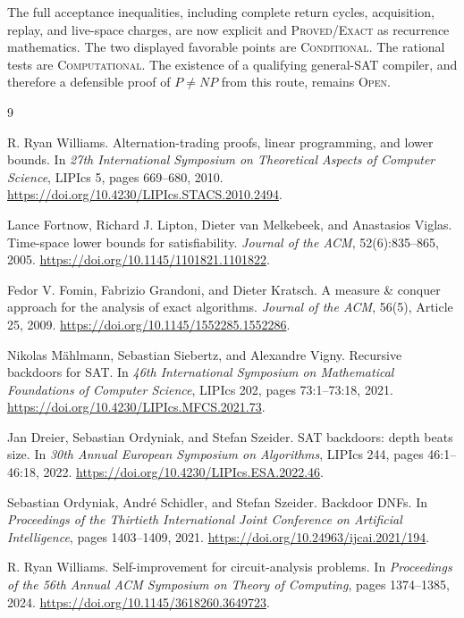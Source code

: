 \documentclass[11pt]{article}
\begin{document}
The full acceptance inequalities, including complete return cycles,
acquisition, replay, and live-space charges, are now explicit and
\textsc{Proved/Exact} as recurrence mathematics.  The two displayed favorable
points are \textsc{Conditional}.  The rational tests are
\textsc{Computational}.  The existence of a qualifying general-SAT compiler,
and therefore a defensible proof of \(P\ne NP\) from this route, remains
\textsc{Open}.

\begin{thebibliography}{9}

R. Ryan Williams.
\newblock Alternation-trading proofs, linear programming, and lower bounds.
\newblock In \emph{27th International Symposium on Theoretical Aspects of
Computer Science}, LIPIcs 5, pages 669--680, 2010.
\newblock \url{https://doi.org/10.4230/LIPIcs.STACS.2010.2494}.

Lance Fortnow, Richard J. Lipton, Dieter van Melkebeek, and Anastasios Viglas.
\newblock Time-space lower bounds for satisfiability.
\newblock \emph{Journal of the ACM}, 52(6):835--865, 2005.
\newblock \url{https://doi.org/10.1145/1101821.1101822}.

Fedor V. Fomin, Fabrizio Grandoni, and Dieter Kratsch.
\newblock A measure \& conquer approach for the analysis of exact algorithms.
\newblock \emph{Journal of the ACM}, 56(5), Article 25, 2009.
\newblock \url{https://doi.org/10.1145/1552285.1552286}.

Nikolas M\"ahlmann, Sebastian Siebertz, and Alexandre Vigny.
\newblock Recursive backdoors for SAT.
\newblock In \emph{46th International Symposium on Mathematical Foundations
of Computer Science}, LIPIcs 202, pages 73:1--73:18, 2021.
\newblock \url{https://doi.org/10.4230/LIPIcs.MFCS.2021.73}.

Jan Dreier, Sebastian Ordyniak, and Stefan Szeider.
\newblock SAT backdoors: depth beats size.
\newblock In \emph{30th Annual European Symposium on Algorithms}, LIPIcs 244,
pages 46:1--46:18, 2022.
\newblock \url{https://doi.org/10.4230/LIPIcs.ESA.2022.46}.

Sebastian Ordyniak, Andr\'e Schidler, and Stefan Szeider.
\newblock Backdoor DNFs.
\newblock In \emph{Proceedings of the Thirtieth International Joint
Conference on Artificial Intelligence}, pages 1403--1409, 2021.
\newblock \url{https://doi.org/10.24963/ijcai.2021/194}.

R. Ryan Williams.
\newblock Self-improvement for circuit-analysis problems.
\newblock In \emph{Proceedings of the 56th Annual ACM Symposium on Theory of
Computing}, pages 1374--1385, 2024.
\newblock \url{https://doi.org/10.1145/3618260.3649723}.

\end{thebibliography}

\end{document}
